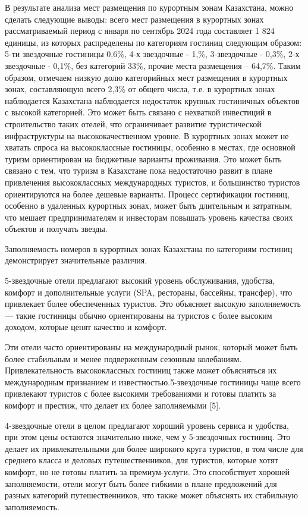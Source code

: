 \begin{multicols}{2}
В результате анализа мест размещения по курортным зонам Казахстана,
можно сделать следующие выводы: всего мест размещения в курортных зонах
рассматриваемый период с января по сентябрь 2024 года составляет 1 824
единицы, из которых распределены по категориям гостиниц следующим
образом: 5-ти звездочные гостиницы 0,6\%, 4-х звездочные - 1,\%,
3-звездочные - 0,3\%, 2-х звездочные - 0,1\%, без категорий 33\%, прочие
места размещения -- 64,7\%. Таким образом, отмечаем низкую долю
категорийных мест размещения в курортных зонах, составляющую всего 2,3\%
от общего числа, т.е. в курортных зонах наблюдается Казахстана
наблюдается недостаток крупных гостиничных объектов с высокой
категорией. Это может быть связано с нехваткой инвестиций в
строительство таких отелей, что ограничивает развитие туристической
инфраструктуры на высококачественном уровне. В курортных зонах может не
хватать спроса на высококлассные гостиницы, особенно в местах, где
основной туризм ориентирован на бюджетные варианты проживания. Это может
быть связано с тем, что туризм в Казахстане пока недостаточно развит в
плане привлечения высококлассных международных туристов, и большинство
туристов ориентируются на более дешевые варианты. Процесс сертификации
гостиниц, особенно в удаленных курортных зонах, может быть длительным и
затратным, что мешает предпринимателям и инвесторам повышать уровень
качества своих объектов и получать звезды.

Заполняемость номеров в курортных зонах Казахстана по категориям
гостиниц демонстрирует значительные различия.

5-звездочные отели предлагают высокий уровень обслуживания, удобства,
комфорт и дополнительные услуги (SPA, рестораны, бассейны, трансфер),
что привлекает более обеспеченных туристов. Это объясняет высокую
заполняемость --- такие гостиницы обычно ориентированы на туристов с
более высоким доходом, которые ценят качество и комфорт.

Эти отели часто ориентированы на международный рынок, который может быть
более стабильным и менее подверженным сезонным колебаниям.
Привлекательность высококлассных гостиниц также может объясняться их
международным признанием и известностью.5-звездочные гостиницы чаще
всего привлекают туристов с более высокими требованиями и готовы платить
за комфорт и престиж, что делает их более заполняемыми {[}5{]}.

4-звездочные отели в целом предлагают хороший уровень сервиса и
удобства, при этом цены остаются значительно ниже, чем у 5-звездочных
гостиниц. Это делает их привлекательными для более широкого круга
туристов, в том числе для среднего класса и деловых путешественников,
для туристов, которые хотят комфорт, но не готовы платить за
премиум-услуги. Это способствует хорошей заполняемости, отели могут быть
более гибкими в плане предложений для разных категорий путешественников,
что также может объяснять их стабильную заполняемость.


\end{multicols}
